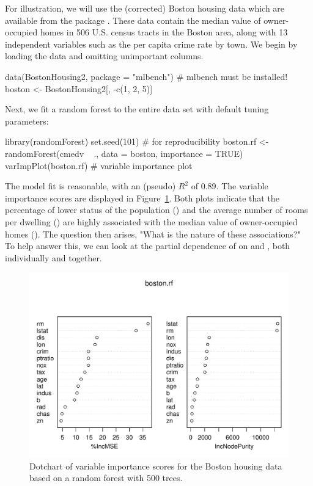 For illustration, we will use the (corrected) Boston housing data which are available from the  package \citep{mlbench-pkg}. These data contain the median value of owner-occupied homes in 506 U.S. census tracts in the Boston area, along with 13 independent variables such as the per capita crime rate by town. We begin by loading the data and omitting unimportant columns.
\begin{example}
data(BostonHousing2, package = "mlbench")  # mlbench must be installed!
boston <- BostonHousing2[, -c(1, 2, 5)]
\end{example}
Next, we fit a random forest to the entire data set with default tuning parameters:
\begin{example}
library(randomForest)
set.seed(101)  # for reproducibility
boston.rf <- randomForest(cmedv ~ ., data = boston, importance = TRUE)
varImpPlot(boston.rf)  # variable importance plot
\end{example}
The model fit is reasonable, with an  (pseudo) $R^2$ of 0.89. The variable importance scores are displayed in Figure~\ref{fig:plotmo_vs_partial}. Both plots indicate that the percentage of lower status of the population () and the average number of rooms per dwelling () are highly associated with the median value of owner-occupied homes (). The question then arises, "What is the nature of these associations?" To help answer this, we can look at the partial dependence of  on  and , both individually and together.

\begin{figure}[htbp]
  \centering
  \includegraphics[width=1.0\linewidth]{boston_rf_vimp}
  \caption{Dotchart of variable importance scores for the Boston housing data based on a random forest with 500 trees.}
  \label{fig:plotmo_vs_partial}
\end{figure}


